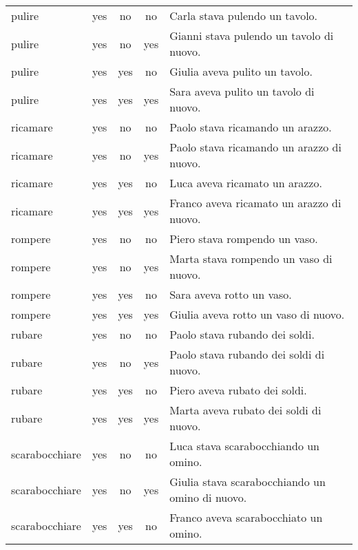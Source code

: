 \begin{longtable}{l|ccc|p{5cm}}
pulire         & yes  & no         & no        & Carla stava pulendo un tavolo.                      \\
pulire         & yes  & no         & yes       & Gianni stava pulendo un tavolo di nuovo.            \\
pulire         & yes  & yes        & no        & Giulia aveva pulito un tavolo.                      \\
pulire         & yes  & yes        & yes       & Sara aveva pulito un tavolo di nuovo.               \\
ricamare       & yes  & no         & no        & Paolo stava ricamando un arazzo.                    \\
ricamare       & yes  & no         & yes       & Paolo stava ricamando un arazzo di nuovo.           \\
ricamare       & yes  & yes        & no        & Luca aveva ricamato un arazzo.                      \\
ricamare       & yes  & yes        & yes       & Franco aveva ricamato un arazzo di nuovo.           \\
rompere        & yes  & no         & no        & Piero stava rompendo un vaso.                       \\
rompere        & yes  & no         & yes       & Marta stava rompendo un vaso di nuovo.              \\
rompere        & yes  & yes        & no        & Sara aveva rotto un vaso.                           \\
rompere        & yes  & yes        & yes       & Giulia aveva rotto un vaso di nuovo.                \\
rubare         & yes  & no         & no        & Paolo stava rubando dei soldi.                      \\
rubare         & yes  & no         & yes       & Paolo stava rubando dei soldi di nuovo.             \\
rubare         & yes  & yes        & no        & Piero aveva rubato dei soldi.                       \\
rubare         & yes  & yes        & yes       & Marta aveva rubato dei soldi di nuovo.              \\
scarabocchiare & yes  & no         & no        & Luca stava scarabocchiando un omino.                \\
scarabocchiare & yes  & no         & yes       & Giulia stava scarabocchiando un omino di nuovo.     \\
scarabocchiare & yes  & yes        & no        & Franco aveva scarabocchiato un omino.               \\

\end{longtable}

